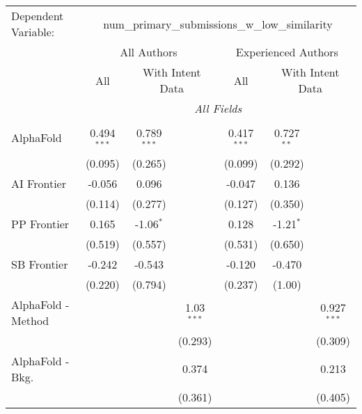 \begingroup
\centering
\begin{tabular}{lcccccc}
   \tabularnewline \midrule \midrule
   Dependent Variable: & \multicolumn{6}{c}{num\_primary\_submissions\_w\_low\_similarity}\\
 & \multicolumn{3}{c}{All Authors} & \multicolumn{3}{c}{Experienced Authors} \\
\cmidrule(lr){2-4} \cmidrule(lr){5-7}
 & \multicolumn{1}{c}{All} & \multicolumn{2}{c}{With Intent Data} & \multicolumn{1}{c}{All} & \multicolumn{2}{c}{With Intent Data} \\
\cmidrule(lr){2-2} \cmidrule(lr){3-4} \cmidrule(lr){5-5} \cmidrule(lr){6-7}
 & \multicolumn{6}{c}{\textit{All Fields}} \\ \\
   AlphaFold            & 0.494$^{***}$ & 0.789$^{***}$ &               & 0.417$^{***}$ & 0.727$^{**}$ &   \\   
                        & (0.095)       & (0.265)       &               & (0.099)       & (0.292)      &   \\   
   AI Frontier          & -0.056        & 0.096         &               & -0.047        & 0.136        &   \\   
                        & (0.114)       & (0.277)       &               & (0.127)       & (0.350)      &   \\   
   PP Frontier          & 0.165         & -1.06$^{*}$   &               & 0.128         & -1.21$^{*}$  &   \\   
                        & (0.519)       & (0.557)       &               & (0.531)       & (0.650)      &   \\   
   SB Frontier          & -0.242        & -0.543        &               & -0.120        & -0.470       &   \\   
                        & (0.220)       & (0.794)       &               & (0.237)       & (1.00)       &   \\   
   AlphaFold - Method   &               &               & 1.03$^{***}$  &               &              & 0.927$^{***}$\\   
                        &               &               & (0.293)       &               &              & (0.309)\\   
   AlphaFold - Bkg.     &               &               & 0.374         &               &              & 0.213\\   
                        &               &               & (0.361)       &               &              & (0.405)\\   

\end{tabular}
